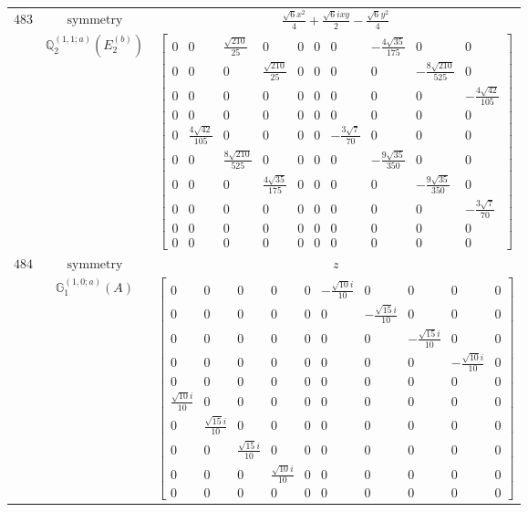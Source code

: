 \documentclass[fleqn,8pt,landscape]{jsarticle}
\begin{document}
\begin{longtable}{ccc}
$ 483 $ & $ \text{symmetry} $ & $ \frac{\sqrt{6} x^{2}}{4} + \frac{\sqrt{6} i x y}{2} - \frac{\sqrt{6} y^{2}}{4} $ \\
$  $ & $ \mathbb{Q}_{2}^{(1,1;a)}(E_{2}^{(b)}) $ & $ \begin{bmatrix} 0 & 0 & \frac{\sqrt{210}}{25} & 0 & 0 & 0 & 0 & - \frac{4 \sqrt{35}}{175} & 0 & 0 \\ 0 & 0 & 0 & \frac{\sqrt{210}}{25} & 0 & 0 & 0 & 0 & - \frac{8 \sqrt{210}}{525} & 0 \\ 0 & 0 & 0 & 0 & 0 & 0 & 0 & 0 & 0 & - \frac{4 \sqrt{42}}{105} \\ 0 & 0 & 0 & 0 & 0 & 0 & 0 & 0 & 0 & 0 \\ 0 & \frac{4 \sqrt{42}}{105} & 0 & 0 & 0 & 0 & - \frac{3 \sqrt{7}}{70} & 0 & 0 & 0 \\ 0 & 0 & \frac{8 \sqrt{210}}{525} & 0 & 0 & 0 & 0 & - \frac{9 \sqrt{35}}{350} & 0 & 0 \\ 0 & 0 & 0 & \frac{4 \sqrt{35}}{175} & 0 & 0 & 0 & 0 & - \frac{9 \sqrt{35}}{350} & 0 \\ 0 & 0 & 0 & 0 & 0 & 0 & 0 & 0 & 0 & - \frac{3 \sqrt{7}}{70} \\ 0 & 0 & 0 & 0 & 0 & 0 & 0 & 0 & 0 & 0 \\ 0 & 0 & 0 & 0 & 0 & 0 & 0 & 0 & 0 & 0 \end{bmatrix} $ \\ \hline
$ 484 $ & $ \text{symmetry} $ & $ z $ \\
$  $ & $ \mathbb{G}_{1}^{(1,0;a)}(A) $ & $ \begin{bmatrix} 0 & 0 & 0 & 0 & 0 & - \frac{\sqrt{10} i}{10} & 0 & 0 & 0 & 0 \\ 0 & 0 & 0 & 0 & 0 & 0 & - \frac{\sqrt{15} i}{10} & 0 & 0 & 0 \\ 0 & 0 & 0 & 0 & 0 & 0 & 0 & - \frac{\sqrt{15} i}{10} & 0 & 0 \\ 0 & 0 & 0 & 0 & 0 & 0 & 0 & 0 & - \frac{\sqrt{10} i}{10} & 0 \\ 0 & 0 & 0 & 0 & 0 & 0 & 0 & 0 & 0 & 0 \\ \frac{\sqrt{10} i}{10} & 0 & 0 & 0 & 0 & 0 & 0 & 0 & 0 & 0 \\ 0 & \frac{\sqrt{15} i}{10} & 0 & 0 & 0 & 0 & 0 & 0 & 0 & 0 \\ 0 & 0 & \frac{\sqrt{15} i}{10} & 0 & 0 & 0 & 0 & 0 & 0 & 0 \\ 0 & 0 & 0 & \frac{\sqrt{10} i}{10} & 0 & 0 & 0 & 0 & 0 & 0 \\ 0 & 0 & 0 & 0 & 0 & 0 & 0 & 0 & 0 & 0 \end{bmatrix} $ \\ \hline

\end{longtable}
\end{document}
